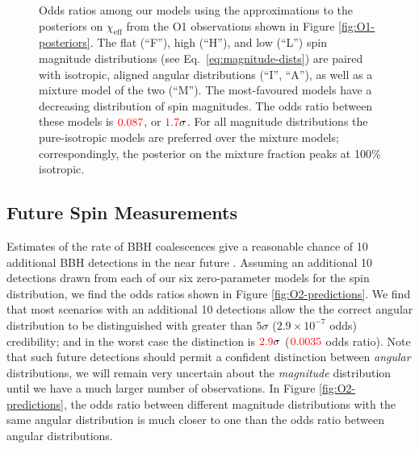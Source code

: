 \documentclass[modern,linenumbers]{aastex61}
\newcommand{\chieff}{\chi_\mathrm{eff}}
\newcommand{\checkme}[1]{\textcolor{red}{#1}}
\newcommand{\OOneSigmaIsoAligned}{\checkme{1.7}}
\newcommand{\OOneOddsIsoAligned}{\checkme{0.087}}
\newcommand{\OTwoSigmaIsoAlignedMin}{\checkme{2.9}}
\newcommand{\OTwoOddsIsoAlignedMin}{\checkme{0.0035}}
\begin{document}
\begin{figure}
  \caption{Odds ratios among our models using the approximations to
    the posteriors on $\chieff$ from the O1 observations shown in
    Figure \ref{fig:O1-posteriors}.  The flat (``F''), high (``H''),
    and low (``L'') spin magnitude distributions (see Eq.\
    \eqref{eq:magnitude-dists}) are paired with isotropic, aligned
    angular distributions (``$\mathrm{I}$'', ``$\mathrm{A}$''), as
    well as a mixture model of the two (``$\mathrm{M}$'').  The
    most-favoured models have a decreasing distribution of spin
    magnitudes.  The odds ratio between these models is
    $\OOneOddsIsoAligned$, or $\OOneSigmaIsoAligned\sigma$.  For all
    magnitude distributions the pure-isotropic models are preferred
    over the mixture models; correspondingly, the posterior on the
    mixture fraction peaks at 100\% isotropic.}
  \label{fig:O1-odds}
\end{figure}

\subsection{Future Spin Measurements}
\label{subsec:future}

Estimates of the rate of \ac{BBH} coalescences give a reasonable
chance of 10 additional \ac{BBH} detections in the near future
\citep{O1-BBH,2016ApJ...833L...1A,2016ApJS..227...14A}.  Assuming an
additional 10 detections drawn from each of our six zero-parameter
models for the spin distribution, we find the odds ratios shown in
Figure \ref{fig:O2-predictions}.  We find that most scenarios with an
additional 10 detections allow the the correct angular distribution to
be distinguished with greater than $5\sigma$ ($2.9 \times 10^{-7}$
odds) credibility; and in the worst case the distinction is
$\OTwoSigmaIsoAlignedMin\sigma$ ($\OTwoOddsIsoAlignedMin$ odds ratio).
Note that such future detections should permit a confident distinction
between \emph{angular} distributions, we will remain very uncertain
about the \emph{magnitude} distribution until we have a much larger
number of observations.  In Figure \ref{fig:O2-predictions}, the odds
ratio between different magnitude distributions with the same angular
distribution is much closer to one than the odds ratio between angular
distributions.
\end{document}
